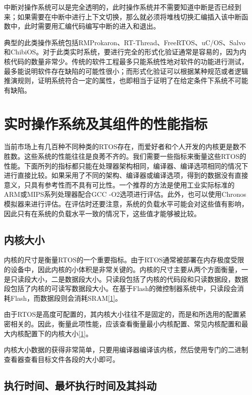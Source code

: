 中断对操作系统可以是完全透明的，此时操作系统并不需要知道中断是否已经到来；如果需要在中断中进行上下文切换，那么就必须将堆栈切换汇编插入该中断函数中，此时需要用汇编代码编写中断的进入和退出。

典型的此类操作系统包括RMProkaron、RT-Thread、FreeRTOS、uC/OS、Salvo和ChibiOS。对于此类实时系统，要进行完全的形式化验证通常是容易的，因为内核代码的数量非常少。传统的软件工程最多只能系统性地对软件的功能进行测试，最多能说明软件存在缺陷的可能性很小；而形式化验证可以根据某种规范或者逻辑推演规则，证明系统符合一定的属性，也即相当于证明了在给定条件下系统不可能有缺陷。

\section{实时操作系统及其组件的性能指标}\label{sec:performance-and-specifications-of-rtoses}

当前市场上有几百种不同种类的RTOS存在，而爱好者和个人开发的内核更是数不胜数。这些系统的性能往往是良莠不齐的。我们需要一些指标来衡量这些RTOS的性能。下面所列的指标都只能在处理器架构相同，编译器、编译选项相同的情况下进行直接比较。如果采用了不同的架构、编译器或编译选项，得到的数据没有直接意义，只具有参考性而不具有可比性。一个推荐的方法是使用工业实际标准的ARM或MIPS系列处理器配合GCC -O2选项进行评估。此外，也可以使用Chronos模拟器来进行评估。在评估时还要注意，系统的负载水平可能会对这些值有影响，因此只有在系统的负载水平一致的情况下，这些值才能够被比较。

\subsection{内核大小}\label{subsec:kernel-size}

内核的尺寸是衡量RTOS的一个重要指标。由于RTOS通常被部署在内存极度受限的设备中，因此内核的小体积是非常关键的。内核的尺寸主要从两个方面衡量，一是只读段大小，二是数据段大小。只读段包括了内核的代码段和只读数据段，数据段包括了内核的可读写数据段大小。在基于Flash的微控制器系统中，只读段会消耗Flash，而数据段则会消耗SRAM\hyperref[sec:chapter-bibliography-2]{{[}1{]}}。

由于RTOS是高度可配置的，其内核大小往往不是固定的，而是和所选用的配置紧密相关的。因此，衡量此项性能，应该查看衡量最小内核配置、常见内核配置和最大内核配置下的内核大小\hyperref[sec:chapter-bibliography-2]{{[}1{]}}。

内核大小数据的获得非常简单，只要用编译器编译该内核，然后使用专门的二进制查看器查看目标文件各段的大小即可。

\subsection{执行时间、最坏执行时间及其抖动}\label{subsec:execution-time-worst-case-execution-time-and-jitter}

